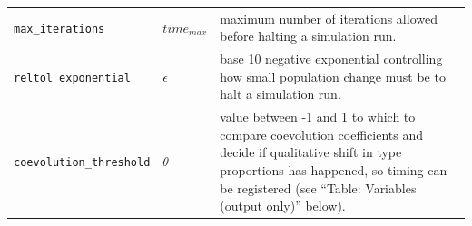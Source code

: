 \documentclass[
]{book}
\begin{document}
\begin{longtable}[]{@{}lll@{}}
\begin{minipage}[t]{0.27\columnwidth}\raggedright
\texttt{max\_iterations}\strut
\end{minipage} & \begin{minipage}[t]{0.25\columnwidth}\raggedright
\(time_{max}\)\strut
\end{minipage} & \begin{minipage}[t]{0.40\columnwidth}\raggedright
maximum number of iterations allowed before halting a simulation run.\strut
\end{minipage}\tabularnewline
\begin{minipage}[t]{0.27\columnwidth}\raggedright
\texttt{reltol\_exponential}\strut
\end{minipage} & \begin{minipage}[t]{0.25\columnwidth}\raggedright
\(\epsilon\)\strut
\end{minipage} & \begin{minipage}[t]{0.40\columnwidth}\raggedright
base 10 negative exponential controlling how small population change must be to halt a simulation run.\strut
\end{minipage}\tabularnewline
\begin{minipage}[t]{0.27\columnwidth}\raggedright
\texttt{coevolution\_threshold}\strut
\end{minipage} & \begin{minipage}[t]{0.25\columnwidth}\raggedright
\(\theta\)\strut
\end{minipage} & \begin{minipage}[t]{0.40\columnwidth}\raggedright
value between -1 and 1 to which to compare coevolution coefficients and decide if qualitative shift in type proportions has happened, so timing can be registered (see ``Table: Variables (output only)'' below).\strut
\end{minipage}\tabularnewline
\bottomrule
\end{longtable}
\end{document}
